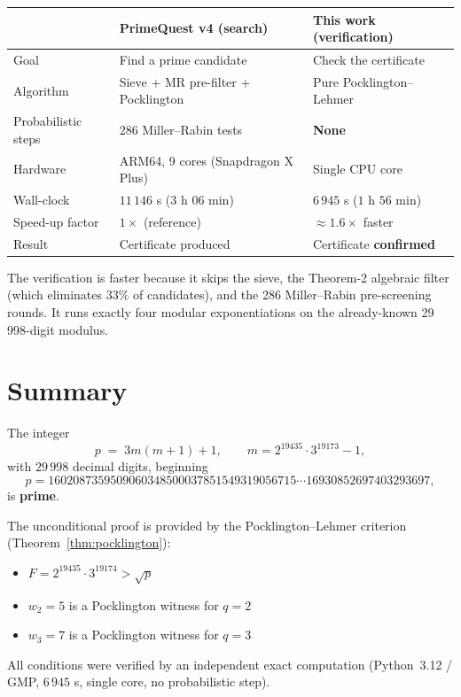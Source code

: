 \documentclass[11pt,a4paper]{article}
\theoremstyle{definition}
\theoremstyle{remark}
\begin{document}
\begin{center}
\renewcommand{\arraystretch}{1.3}
\begin{tabular}{@{}lll@{}}
\toprule
 & \textbf{PrimeQuest v4 (search)} & \textbf{This work (verification)} \\
\midrule
Goal      & Find a prime candidate         & Check the certificate \\
Algorithm & Sieve + MR pre-filter + Pocklington
           & Pure Pocklington--Lehmer \\
Probabilistic steps & 286 Miller--Rabin tests       & \textbf{None} \\
Hardware  & ARM64, 9 cores (Snapdragon X Plus) & Single CPU core \\
Wall-clock & $11\,146$ s ($3$ h $06$ min)   & $6\,945$ s ($1$ h $56$ min) \\
Speed-up factor & $1\times$ (reference)        & $\approx 1.6\times$ faster \\
Result    & Certificate produced           & Certificate \textbf{confirmed} \\
\bottomrule
\end{tabular}
\end{center}

\medskip
\noindent
The verification is faster because it skips the sieve, the Theorem-2
algebraic filter (which eliminates $33\%$ of candidates), and the 286
Miller--Rabin pre-screening rounds. It runs exactly four modular
exponentiations on the already-known 29\,998-digit modulus.

\section{Summary}

\begin{rigorousbox}[title={\textbf{Final statement}}]
The integer
\[
  p \;=\; 3m(m+1)+1, \qquad m = 2^{19435}\cdot 3^{19173}-1,
\]
with $29\,998$ decimal digits, beginning
\[
  p = 1602087359509060348500037851549319056715\cdots 16930852697403293697,
\]
is \textbf{prime}.

\medskip
\noindent
The unconditional proof is provided by the Pocklington--Lehmer criterion
(Theorem~\ref{thm:pocklington}):
\begin{itemize}[nosep]
  \item $F = 2^{19435}\cdot 3^{19174} > \sqrt{p}$ \hfill\checkmark
  \item $w_2 = 5$ is a Pocklington witness for $q=2$ \hfill\checkmark
  \item $w_3 = 7$ is a Pocklington witness for $q=3$ \hfill\checkmark
\end{itemize}

\medskip
\noindent
All conditions were verified by an independent exact computation
(Python~3.12 / GMP, $6\,945$ s, single core, no probabilistic step).
\end{rigorousbox}
\end{document}
